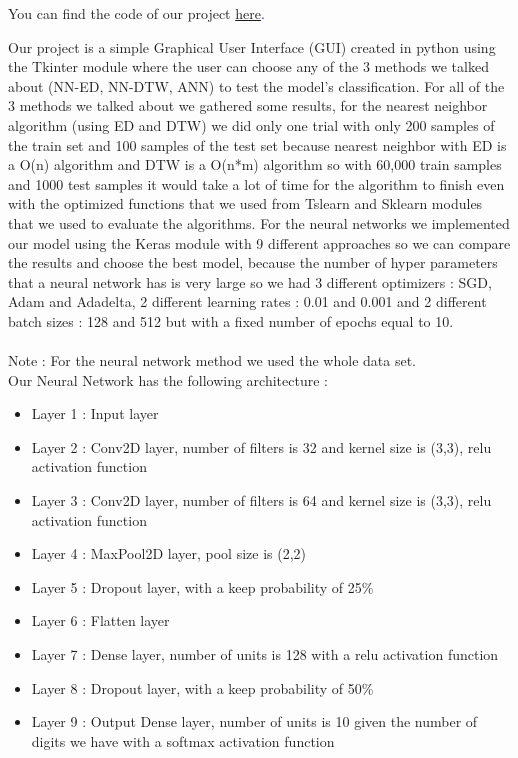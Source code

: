 \documentclass[10pt,a4paper]{article}
\begin{document}
You can find the code of our project \textcolor{blue}{\href{https://github.com/hadifawaz1999/Mini_Project}{here}.}

Our project is a simple Graphical User Interface (GUI) created in python using the Tkinter module where the user can choose any of the 3 methods we talked about (NN-ED, NN-DTW, ANN) to test the model's classification. For all of the 3 methods we talked about we gathered some results, for the nearest neighbor algorithm (using ED and DTW) we did only one trial with only 200 samples of the train set and 100 samples of the test set because nearest neighbor with ED is a O(n) algorithm and DTW is a O(n*m) algorithm so with 60,000 train samples and 1000 test samples it would take a lot of time for the algorithm to finish even with the optimized functions that we used from Tslearn and Sklearn modules that we used to evaluate the algorithms. For the neural networks we implemented our model using the Keras module with 9 different approaches so we can compare the results and choose the best model, because the number of hyper parameters that a neural network has is very large so we had 3 different optimizers : SGD, Adam and Adadelta, 2 different learning rates : 0.01 and 0.001 and 2 different batch sizes : 128 and 512 but with a fixed number of epochs equal to 10.\\\\
Note : For the neural network method we used the whole data set.\\
Our Neural Network has the following architecture :\\
\begin{itemize}
\item Layer 1 : Input layer
\item Layer 2 : Conv2D layer, number of filters is 32 and kernel size is (3,3), relu activation function
\item Layer 3 : Conv2D layer, number of filters is 64 and kernel size is (3,3), relu activation function
\item Layer 4 : MaxPool2D layer, pool size is (2,2)
\item Layer 5 : Dropout layer, with a keep probability of 25\%
\item Layer 6 : Flatten layer
\item Layer 7 : Dense layer, number of units is 128 with a relu activation function
\item Layer 8 : Dropout layer, with a keep probability of 50\%
\item Layer 9 : Output Dense layer, number of units is 10 given the number of digits we have with a softmax activation function
\end{itemize}
\end{document}
